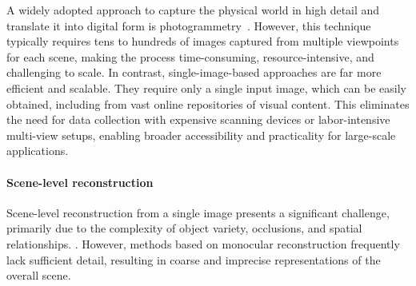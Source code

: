 A widely adopted approach to capture the physical world in high detail and translate it into digital form is photogrammetry~\cite{MVS,chen2018deep,mildenhall2020nerf,barron2021mip,barron2022mip,muller2022instant,kerbl3Dgaussians}. However, this technique typically requires tens to hundreds of images captured from multiple viewpoints for each scene, making the process time-consuming, resource-intensive, and challenging to scale.
In contrast, single-image-based approaches are far more efficient and scalable. They require only a single input image, which can be easily obtained, including from vast online repositories of visual content. This eliminates the need for data collection with expensive scanning devices or labor-intensive multi-view setups, enabling broader accessibility and practicality for large-scale applications.

\paragraph{Scene-level reconstruction}
Scene-level reconstruction from a single image presents a significant challenge, primarily due to the complexity of object variety, occlusions, and spatial relationships. 
. %
However, methods based on monocular reconstruction frequently lack sufficient detail, resulting in coarse and imprecise representations of the overall scene.

